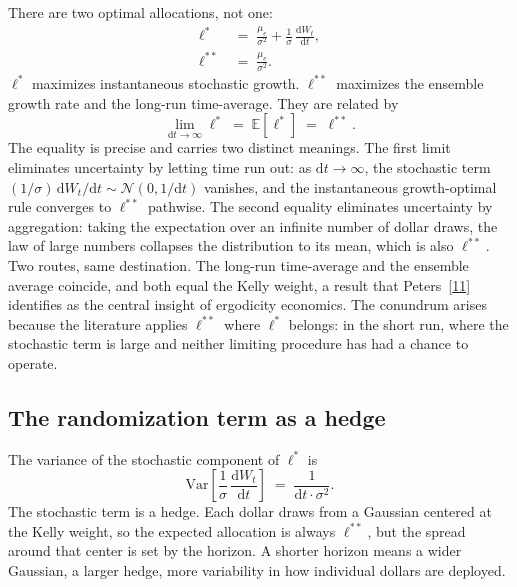 \documentclass[11pt]{article}
\newcommand{\lopt}{\ell^{*}}
\newcommand{\lkelly}{\ell^{**}}
\newcommand{\mue}{\mu_{e}}
\newcommand{\E}{\mathbb{E}}
\newcommand{\Var}{\mathrm{Var}}
\newcommand{\dd}{\mathrm{d}}
\begin{document}
There are two optimal allocations, not one:
\begin{align}
  \lopt &\;=\; \frac{\mue}{\sigma^{2}}
    + \frac{1}{\sigma}\,\frac{\dd W_{t}}{\dd t},
  \label{eq:lstar2} \\[6pt]
  \lkelly &\;=\; \frac{\mue}{\sigma^{2}}.
  \label{eq:lkelly}
\end{align}
$\lopt$ maximizes instantaneous stochastic growth. $\lkelly$ maximizes
the ensemble growth rate and the long-run time-average. They are
related by
\begin{equation}
  \lim_{\dd t \to \infty} \lopt \;=\; \E[\lopt] \;=\; \lkelly.
  \label{eq:convergence}
\end{equation}
The equality is precise and carries two distinct meanings. The first
limit eliminates uncertainty by letting time run out: as $\dd t \to
\infty$, the stochastic term $(1/\sigma)\,\dd W_{t}/\dd t \sim
\mathcal{N}(0, 1/\dd t)$ vanishes, and the instantaneous
growth-optimal rule converges to $\lkelly$ pathwise. The second
equality eliminates uncertainty by aggregation: taking the expectation
over an infinite number of dollar draws, the law of large numbers
collapses the distribution to its mean, which is also $\lkelly$. Two
routes, same destination. The long-run time-average and the ensemble
average coincide, and both equal the Kelly weight, a result that
Peters~[\hyperlink{ref:11}{11}] identifies as the central insight of ergodicity economics.
The conundrum arises because the literature applies $\lkelly$ where
$\lopt$ belongs: in the short run, where the stochastic term is large
and neither limiting procedure has had a chance to operate.

\subsection{The randomization term as a hedge}

The variance of the stochastic component of $\lopt$ is
\begin{equation}
  \Var\!\left[\frac{1}{\sigma}\,\frac{\dd W_{t}}{\dd t}\right]
  \;=\; \frac{1}{\dd t \cdot \sigma^{2}}.
  \label{eq:var}
\end{equation}
The stochastic term is a hedge. Each dollar draws from a Gaussian
centered at the Kelly weight, so the expected allocation is always $\lkelly$, but the spread around that center is set by the horizon.
A shorter horizon means a wider Gaussian, a larger hedge, more
variability in how individual dollars are deployed.
\end{document}
